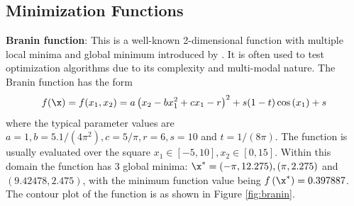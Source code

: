 \documentclass [PhD] {package/uclathes}
\begin{document}
\subsection{Minimization Functions}

  \textbf{Branin function}: This is a well-known 2-dimensional function with multiple local minima and global minimum introduced by \textcite{dixon1978towards}. It is often used to test optimization algorithms due to its complexity and multi-modal nature. The Branin function has the form
\begin{equation*}
  f(\x)=  f(x_1, x_2)=a\left(x_2-b x_1^2+c x_1-r\right)^2+s(1-t) \cos \left(x_1\right)+s
\end{equation*}
where the typical parameter values are
\(a=1, b=5.1 /\left(4 \pi^2\right), c=5 / \pi, r=6, s=10\) and
\(t=1 /(8 \pi)\). The function is usually evaluated over the square
\(x_1 \in[-5,10], x_2 \in[0,15]\). Within this domain the function has 3
global minima: \(\x^*=(-\pi, 12.275),(\pi, 2.275)\) and
\((9.42478,2.475)\), with the minimum function value being
\(f\left(\x^*\right)=0.397887\). The contour plot of the function is as
shown in Figure \ref{fig:branin}.
\end{document}
